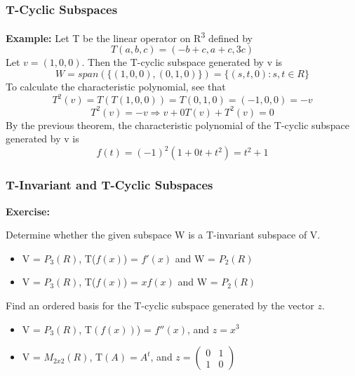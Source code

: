 \documentclass[11pt]{beamer}
\begin{document}
\begin{frame}
	\frametitle{T-Cyclic Subspaces}
	\textbf{Example: } Let T be the linear operator on R\textsuperscript{3} defined by 
	\[ T(a,b,c) = (-b+c, a+c, 3c)\]
	Let $v = (1,0,0)$. Then the T-cyclic subspace generated by v is
	\[W = span(\{(1,0,0),(0,1,0)\}) = \{(s,t,0):s,t \in R \}\]
	To calculate the characteristic polynomial, see that
	\[T^{2}(v) = T(T(1,0,0)) = T(0,1,0) = (-1,0,0) = -v \]
	\[T^{2}(v) = -v \Longrightarrow v + 0T(v) + T^{2}(v) = 0 \]
	By the previous theorem, the characteristic polynomial of the T-cyclic subspace generated by v is
	\[ f(t) = (-1)^{2}(1 + 0t + t^2) = t^2 + 1 \]
\end{frame}

\begin{frame}
	\frametitle{T-Invariant and T-Cyclic Subspaces}
	\textbf{Exercise: }
	
	Determine whether the given subspace W is a T-invariant subspace of V.
	\begin{itemize}
		\item V = $P_{3}(R)$, T($f(x)$) = $f'(x)$ and W = $P_{2}(R)$
		\item V = $P_{3}(R)$, T($f(x)$) = $xf(x)$ and W = $P_{2}(R)$
	\end{itemize}

	\phantom{text}
	
	Find an ordered basis for the T-cyclic subspace generated by the vector $z$.
	\begin{itemize}
		\item V = $P_{3}(R)$, T$(f(x))$) = $f''(x)$, and $z=x^{3}$
		\item V = $M_{2x2}(R)$, T$(A) = A^{t}$, and $z = 
		\begin{pmatrix}
			0 & 1 \\
			1 & 0
		\end{pmatrix}$
	\end{itemize}
\end{frame}
\end{document}
